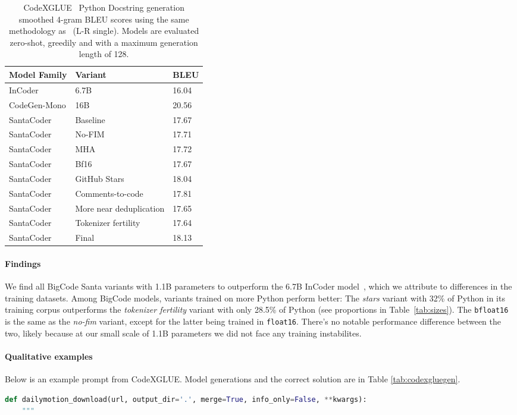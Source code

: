 \documentclass[10pt]{article} \usepackage{iclr2023_conference,times}
\begin{document}
\begin{table}[t]
\centering
\begin{tabular}{lll}
\toprule
Model Family & Variant & BLEU\\
\midrule
InCoder & 6.7B & 16.04\\
CodeGen-Mono & 16B & 20.56\\
\midrule
SantaCoder & Baseline & 17.67\\
SantaCoder & No-FIM & 17.71\\
SantaCoder & MHA & 17.72\\
SantaCoder & Bf16 & 17.67\\
\midrule
SantaCoder& GitHub Stars & 18.04\\
SantaCoder & Comments-to-code & 17.81\\
SantaCoder & More near deduplication & 17.65\\
SantaCoder & Tokenizer fertility & 17.64\\
\midrule
SantaCoder & Final & 18.13\\
\bottomrule
\end{tabular}
\caption{CodeXGLUE~\citep{lu2021codexglue} Python Docstring generation smoothed 4-gram BLEU scores using the same methodology as~\citet{fried2022incoder} (L-R single). Models are evaluated zero-shot, greedily and with a maximum generation length of 128.}
\label{tab:codexglue}
\end{table}

\paragraph{Findings} We find all BigCode Santa variants with 1.1B parameters to outperform the 6.7B InCoder model~\citep{fried2022incoder}, which we attribute to differences in the training datasets. Among BigCode models, variants trained on more Python perform better: The \emph{stars} variant with 32\% of Python in its training corpus outperforms the \emph{tokenizer fertility} variant with only 28.5\% of Python (see proportions in Table~\ref{tab:sizes}). The \texttt{bfloat16} is the same as the \emph{no-fim} variant, except for the latter being trained in \texttt{float16}. There's no notable performance difference between the two, likely because at our small scale of 1.1B parameters we did not face any training instabilites.

\paragraph{Qualitative examples} Below is an example prompt from CodeXGLUE. Model generations and the correct solution are in Table \ref{tab:codexgluegen}.
\begin{lstlisting}[language=python]
def dailymotion_download(url, output_dir='.', merge=True, info_only=False, **kwargs):
    """
\end{lstlisting}
\end{document}

